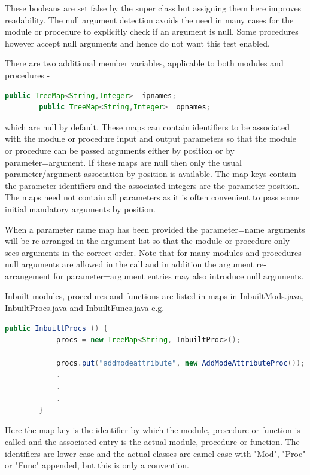     These booleans are set false by the super class but assigning them here
    improves readability. The null argument detection avoids the need in many
    cases for the module or procedure to explicitly check if an argument is null.
    Some procedures however accept null arguments and hence do not want this test
    enabled.
    
    There are two additional member variables, applicable to both modules
    and procedures -
    
    \begin{lstlisting}[gobble=4, language=java]
        public TreeMap<String,Integer>  ipnames;
        public TreeMap<String,Integer>  opnames;
    \end{lstlisting}
    
    which are null by default. These maps can contain identifiers to be
    associated with the module or procedure input and output parameters so that
    the module or procedure can be passed arguments either by position or by
    parameter=argument. If these maps are null then only the usual 
    parameter/argument association by position is available. The map keys contain
    the parameter identifiers and the associated integers are the parameter
    position. The maps need not contain all parameters as it is often convenient
    to pass some initial mandatory arguments by position.
    
    When a parameter name map has been provided the parameter=name arguments
    will be re-arranged in the argument list so that the module or
    procedure only sees arguments in the correct order. Note that for many
    modules and procedures null arguments are allowed in the call and in addition
    the argument re-arrangement for parameter=argument entries may also
    introduce null arguments.
    
    Inbuilt modules, procedures and functions are listed in maps in
    InbuiltMods.java, InbuiltProcs.java and InbuiltFuncs.java e.g. -
    
    \begin{lstlisting}[gobble=4, language=java]
        public InbuiltProcs () {
            procs = new TreeMap<String, InbuiltProc>();

            procs.put("addmodeattribute", new AddModeAttributeProc());
            .
            .
            .
        }
    \end{lstlisting}
    
    Here the map key is the identifier by which the module, procedure
    or function is called and the associated entry is the actual
    module, procedure or function. The identifiers are lower case
    and the actual classes are camel case with "Mod", "Proc" or "Func"
    appended, but this is only a convention.    


